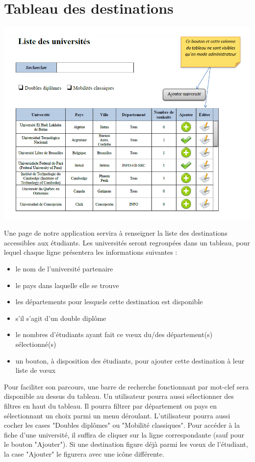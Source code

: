 \section{Tableau des destinations}
\includegraphics[scale=0.7]{Universites/listeUnivs.png}


Une page de notre application servira à renseigner la liste des destinations accessibles aux étudiants.
Les universités seront regroupées dans un tableau, pour lequel chaque ligne présentera les informations suivantes :
 \begin{itemize}
 	\item le nom de l'université partenaire
 	\item le pays dans laquelle elle se trouve
 	\item les départements pour lesquels cette destination est disponible
 	\item s'il s'agit d'un double diplôme
 	\item le nombres d'étudiants ayant fait ce vœux du/des département(s) sélectionné(s)
 	\item un bouton, à disposition des étudiants, pour ajouter cette destination à leur liste de vœux
 \end{itemize}
 
  Pour faciliter son parcours, une barre de recherche fonctionnant par mot-clef sera disponible au dessus du tableau. Un utilisateur pourra aussi sélectionner des filtres en haut du tableau. Il pourra filtrer par département ou pays en sélectionnant un choix parmi un menu déroulant. L'utilisateur pourra aussi cocher les cases "Doubles diplômes" ou "Mobilité classiques". Pour accéder à la fiche d'une université, il suffira de cliquer sur la ligne correspondante (sauf pour le bouton "Ajouter"). Si une destination figure déjà parmi les vœux de l'étudiant, la case "Ajouter" le figurera avec une icône différente.
  
